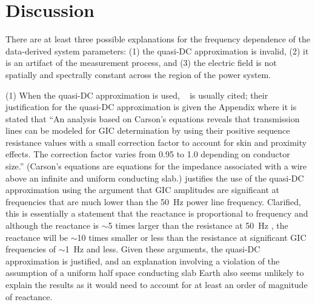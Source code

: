 \documentclass[draft,linenumbers]{agujournal2018}
\begin{document}


\section{Discussion}

There are at least three possible explanations for the frequency dependence of the data-derived system parameters: (1) the quasi-DC approximation is invalid, (2) it is an artifact of the measurement process, and (3) the electric field is not spatially and spectrally constant across the region of the power system. 

(1) When the quasi-DC approximation is used, ~\cite{Albertson1981} is usually cited; their justification for the quasi-DC approximation is given the Appendix where it is stated that ``An analysis based on Carson's equations reveals that transmission lines can be modeled for GIC determination by using their positive sequence resistance values with a small correction factor to account for skin and proximity effects. The correction factor varies from 0.95 to 1.0 depending on conductor size.'' (Carson's equations  \citep{Carson1926,Kersting2002} are equations for the impedance associated with a wire above an infinite and uniform conducting slab.) \cite{Lehtinen1985} justifies the use of the quasi-DC approximation using the argument that GIC amplitudes are significant at frequencies that are much lower than the 50~Hz power line frequency. Clarified, this is essentially a statement that the reactance is proportional to frequency and although the reactance is $\sim$5 times larger than the resistance at 50~Hz \citep{Purchala200}, the reactance will be $\sim$10 times smaller or less than the resistance at significant GIC frequencies of $\sim$1~Hz and less. Given these arguments, the quasi-DC approximation is justified, and an explanation involving a violation of the assumption of a uniform half space conducting slab Earth also seems unlikely to explain the results as it would need to account for at least an order of magnitude of reactance.
\end{document}
